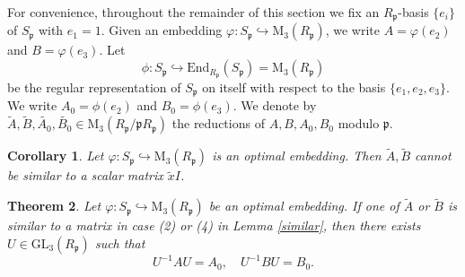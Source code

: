 \documentclass[12pt]{article}
\theoremstyle{plain}
\newtheorem{theorem}{Theorem}[section]
\newtheorem{corollary}[theorem]{Corollary}
\theoremstyle{definition}
\theoremstyle{remark}
\begin{document}
For convenience, throughout the remainder of this section we fix an $R_\mathfrak{p}$-basis $\{e_i\}$ of $S_\mathfrak{p}$ with $e_1 = 1$. Given an embedding $\varphi: S_\mathfrak{p} \hookrightarrow \mathrm{M}_3(R_\mathfrak{p})$, we write $A=\varphi(e_2)$ and $B=\varphi(e_3)$. Let 
$$\phi:S_\mathfrak{p}\hookrightarrow \mathrm{End}_{R_\mathfrak{p}}(S_\mathfrak{p})=\mathrm{M}_3(R_\mathfrak{p})$$ 
be the regular representation of $S_\mathfrak{p}$ on itself with respect to the basis $\{e_1,e_2,e_3\}$. We write $A_0=\phi(e_2)$ and $B_0=\phi(e_3)$. We denote by $\widetilde{A}, \widetilde{B}, \widetilde{A_0}, \widetilde{B_0} \in \mathrm{M}_3(R_\mathfrak{p}/\mathfrak{p}R_\mathfrak{p})$ the reductions of $A, B, A_0, B_0$ modulo $\mathfrak{p}$.

\begin{corollary} 
Let $\varphi :S_\mathfrak{p}\hookrightarrow \mathrm{M}_3(R_\mathfrak{p})$ is an optimal embedding. Then $\widetilde{A},\widetilde{B}$ cannot be similar to a scalar matrix $\widetilde{x}I$. 
\end{corollary}

\begin{theorem}
Let $\varphi : S_\mathfrak{p} \hookrightarrow \mathrm{M}_3(R_\mathfrak{p})$ be an optimal embedding. If one of $\widetilde{A}$ or $\widetilde{B}$ is similar to a matrix in case (2) or (4) in Lemma \ref{similar}, then there exists $U \in \mathrm{GL}_3(R_\mathfrak{p})$ such that 
$$U^{-1}AU = A_0,\quad U^{-1}BU = B_0.$$
\end{theorem}
\end{document}
